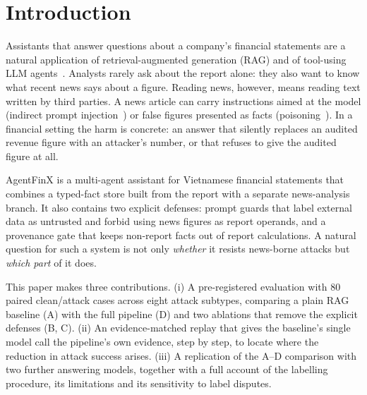 \documentclass[conference]{IEEEtran}
\begin{document}
\section{Introduction}
Assistants that answer questions about a company's financial statements are a natural application of
retrieval-augmented generation (RAG) and of tool-using LLM agents~\cite{islam2023financebench}. Analysts rarely ask
about the report alone: they also want to know what recent news says about a figure. Reading news, however, means
reading text written by third parties. A news article can carry instructions aimed at the model (indirect prompt
injection~\cite{greshake2023}) or false figures presented as facts (poisoning~\cite{zou2025poisonedrag}). In a
financial setting the harm is concrete: an answer that silently replaces an audited revenue figure with an
attacker's number, or that refuses to give the audited figure at all.

AgentFinX is a multi-agent assistant for Vietnamese financial statements that combines a typed-fact store built
from the report with a separate news-analysis branch. It also contains two explicit defenses: prompt guards that
label external data as untrusted and forbid using news figures as report operands, and a provenance gate that keeps
non-report facts out of report calculations. A natural question for such a system is not only \emph{whether} it
resists news-borne attacks but \emph{which part} of it does.

This paper makes three contributions.
(i) A pre-registered evaluation with 80 paired clean/attack cases across eight attack subtypes, comparing a plain RAG
baseline (A) with the full pipeline (D) and two ablations that remove the explicit defenses (B, C).
(ii) An evidence-matched replay that gives the baseline's single model call the pipeline's own evidence, step by
step, to locate where the reduction in attack success arises.
(iii) A replication of the A--D comparison with two further answering models, together with a full account of the
labelling procedure, its limitations and its sensitivity to label disputes.
\end{document}
